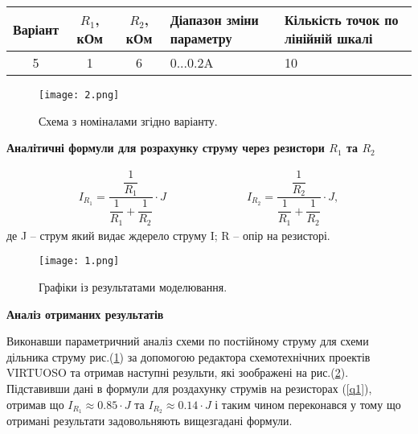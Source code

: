 \documentclass[a4paper,14pt]{extreport}
\begin{document}
\begin{tabularx}{16cm}{|c|c|c|X|X|}
\hline
Варіант & $R_1 $, кОм & $R_2 $, кОм &  Діапазон зміни параметру & Кількість точок по лінійній шкалі\\
\hline
5 & 1 & 6 & \hspace{1.4cm}0...0.2A  & \hspace{1.8cm} 10\\
\hline
\end{tabularx}


\begin{figure}[h]
\begin{center}
\texttt{[image: 2.png]}
\caption{Схема з номіналами згідно варіанту.}
\label{ris1}
\end{center}
\end{figure}



\begin{center}\textbf{Аналітичні формули для розрахунку струму через резистори $R_1$ та $R_2$} \end{center}

\begin{align}
  I_{R_1} = \dfrac{\dfrac{1}{R_1} }{ \dfrac{1}{R_1} + \dfrac{1}{R_2}} \cdot J \hspace{3cm} I_{R_2} = \dfrac{\dfrac{1}{R_2} }{ \dfrac{1}{R_1} + \dfrac{1}{R_2}} \cdot J ,
\label{q1}
\end{align}
де J -- струм який видає ждерело струму I; R -- опір на резисторі.


\begin{figure}[h]
\begin{center}
\texttt{[image: 1.png]}
\caption{Графіки із результатами моделювання.}
\label{ris2}
\end{center}
\end{figure}

\newpage
\begin{center}\textbf{Аналіз отриманих результатів} \end{center}

Виконавши параметричний аналіз схеми по постійному струму для схеми дільника
струму рис.(\ref{ris1}) за допомогою редактора схемотехнічних проектів VIRTUOSO та отримав наступні результи, які зоображені на рис.(\ref{ris2}). Підставивши дані в формули для роздахунку струмів на резисторах (\ref{q1}), отримав що $I_{R_1} \approx 0.85\cdot J$  та $I_{R_2} \approx 0.14 \cdot J$ і таким чином переконався у тому що отримані результати задовольняють вищезгадані формули.
\end{document}
